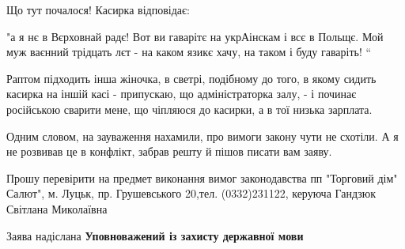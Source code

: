 Що тут почалося! Касирка відповідає:

"а я нє в Вєрховнай радє! Вот ви гаварітє на укрАінскам і всє в Польщє. Мой муж
ваєнний трідцать лєт - на каком язикє хачу, на таком і буду гаваріть! “

Раптом підходить інша жіночка, в светрі, подібному до того, в якому сидить
касирка на іншій касі - припускаю, що адміністраторка залу, - і починає
російською сварити мене, що чіпляюся до касирки, а в тої низька зарплата.

Одним словом, на зауваження нахамили, про вимоги закону чути не схотіли. А я не
розвивав це в конфлікт, забрав решту й пішов писати вам заяву.

Прошу перевірити на предмет виконання вимог законодавства пп "Торговий дім"
Салют", м. Луцьк, пр. Грушевського 20,тел. (0332)231122, керуюча Гандзюк
Світлана Миколаївна

Заява надіслана \textbf{Уповноважений із захисту державної мови}

